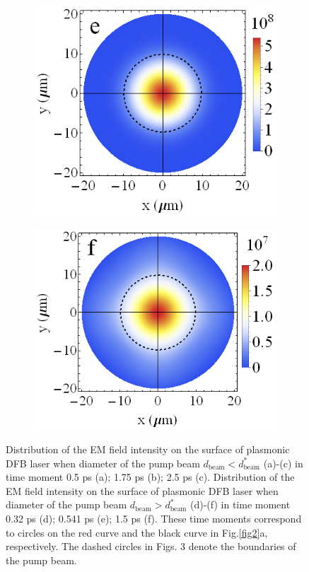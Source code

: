 \documentclass[aps,pra,amsmath,amssymb,onecolumn,superscriptaddress,showpacs,floatfix,]{revtex4-1}
\begin{document}
\begin{figure}[h]
\begin{subfigure}[h]{0.32\linewidth}
		\includegraphics[width=\linewidth]{Fig3e.png}
	\end{subfigure}
	\begin{subfigure}[h]{0.32\linewidth}
		\includegraphics[width=\linewidth]{Fig3f.png}
	\end{subfigure}
	\caption{Distribution of the EM field intensity on the surface of plasmonic DFB laser when diameter of the pump beam $d_{\text{beam}}<d_{\text{beam}}^*$ (a)-(c) in time moment 0.5 ps (a); 1.75 ps (b); 2.5 ps (c). Distribution of the EM field intensity on the surface of plasmonic DFB laser when diameter of the pump beam $d_{\text{beam}}>d_{\text{beam}}^*$ (d)-(f) in time moment 0.32 ps (d); 0.541 ps (e); 1.5 ps (f). These time moments correspond to circles on the red curve and the black curve in Fig.\ref{fig2}a, respectively. The dashed circles in Figs. 3 denote the boundaries of the pump beam.}
	\label{fig3}	
\end{figure}
\end{document}

